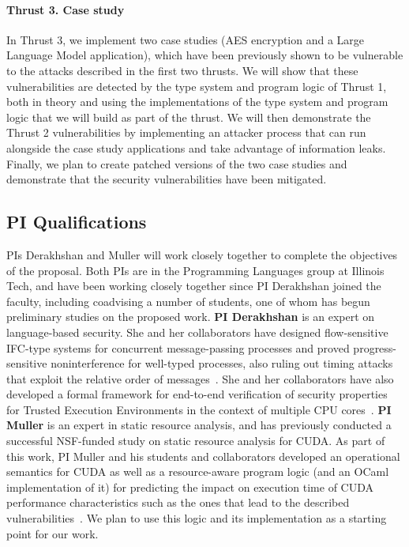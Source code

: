 

\paragraph{Thrust 3. Case study}
In Thrust 3, we implement two case studies (AES encryption and a Large Language Model application), which have been previously shown to be vulnerable to the attacks described in the first two thrusts.
%
We will show that these vulnerabilities are detected by the type system and program logic of Thrust 1, both in theory and using the implementations of the type system and program logic that we will build as part of the thrust.
%
We will then demonstrate the Thrust 2 vulnerabilities by implementing an attacker process that can run alongside the case study applications and take advantage of information leaks.
%
Finally, we plan to create patched versions of the two case studies and demonstrate that the security vulnerabilities have been mitigated.


\subsection{PI Qualifications}

PIs Derakhshan and Muller will work closely together to complete the objectives
of the proposal.
%
Both PIs are in the Programming Languages group at Illinois Tech, and have been
working closely together since PI Derakhshan joined the faculty, including
coadvising a number of students, one of whom has begun preliminary studies
on the proposed work.
%
{\bf PI Derakhshan} is an expert on language-based security.
%
She and her collaborators have designed flow-sensitive IFC-type systems for concurrent message-passing processes and proved progress-sensitive noninterference for well-typed processes, also ruling out timing attacks that exploit the relative order of messages~\cite{derakhshan2021LICS, van2024ecoop,derakhshan2024ecoop}.
%
She and her collaborators have also developed a formal framework for end-to-end verification of security properties for Trusted Execution Environments in the context of multiple CPU cores~\cite{derakhshan2023CSF}.  
%
{\bf PI Muller} is an expert in static resource analysis, and has previously
conducted a successful NSF-funded study on static resource analysis for CUDA.
%
As part of this work, PI Muller and his students and collaborators
developed an operational semantics for CUDA as well as a resource-aware
program logic (and an OCaml implementation of it) for predicting the impact
on execution time of CUDA performance characteristics such as the ones
that lead to the described vulnerabilities~\cite{MullerHo21}.
%
We plan to use this logic and its implementation as a starting point for
our work.
